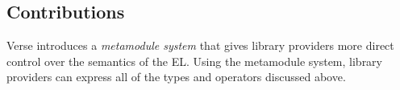 

\subsection{Contributions}\label{sec:metamodules-solution}


Verse introduces a \emph{metamodule system} that gives library providers more direct control over the semantics of the EL. Using the metamodule system, library providers can express all of the types and operators discussed above.

